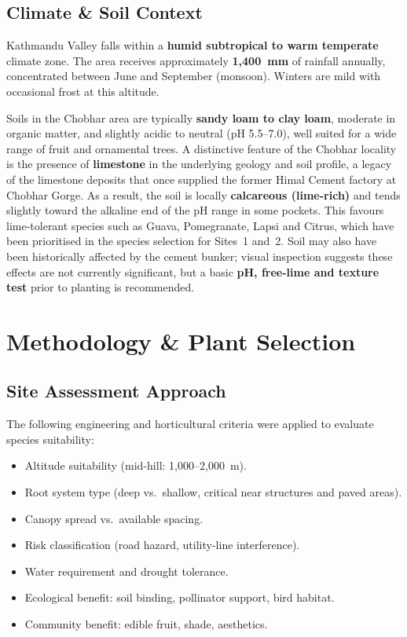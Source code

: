 \documentclass[11pt,a4paper]{article}
\begin{document}
\subsection{Climate \& Soil Context}
Kathmandu Valley falls within a \textbf{humid subtropical to warm temperate} climate zone. The area receives approximately \textbf{1{,}400~mm} of rainfall annually, concentrated between June and September (monsoon). Winters are mild with occasional frost at this altitude.

Soils in the Chobhar area are typically \textbf{sandy loam to clay loam}, moderate in organic matter, and slightly acidic to neutral (pH 5.5--7.0), well suited for a wide range of fruit and ornamental trees. A distinctive feature of the Chobhar locality is the presence of \textbf{limestone} in the underlying geology and soil profile, a legacy of the limestone deposits that once supplied the former Himal Cement factory at Chobhar Gorge. As a result, the soil is locally \textbf{calcareous (lime-rich)} and tends slightly toward the alkaline end of the pH range in some pockets. This favours lime-tolerant species such as Guava, Pomegranate, Lapsi and Citrus, which have been prioritised in the species selection for Sites~1 and~2. Soil may also have been historically affected by the cement bunker; visual inspection suggests these effects are not currently significant, but a basic \textbf{pH, free-lime and texture test} prior to planting is recommended.

\section{Methodology \& Plant Selection}
\label{sec:methodology}

\subsection{Site Assessment Approach}
The following engineering and horticultural criteria were applied to evaluate species suitability:
\begin{itemize}
  \item Altitude suitability (mid-hill: 1{,}000--2{,}000~m).
  \item Root system type (deep vs.\ shallow, critical near structures and paved areas).
  \item Canopy spread vs.\ available spacing.
  \item Risk classification (road hazard, utility-line interference).
  \item Water requirement and drought tolerance.
  \item Ecological benefit: soil binding, pollinator support, bird habitat.
  \item Community benefit: edible fruit, shade, aesthetics.
\end{itemize}
\end{document}
